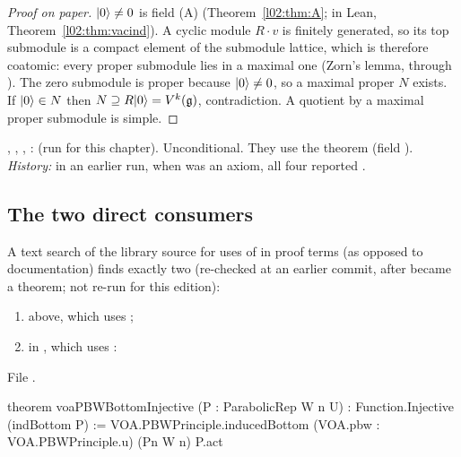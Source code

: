 \begin{proof}[Proof on paper]
$|0\rangle\ne0$ is field (A) (Theorem~\ref{l02:thm:A}; in Lean, Theorem~\ref{l02:thm:vacind}). A cyclic module $R\cdot v$ is finitely generated, so
its top submodule is a compact element of the submodule lattice, which is therefore coatomic: every
proper submodule lies in a maximal one (Zorn's lemma, through \allowbreak{}\allowbreak{}\allowbreak{}\allowbreak{}).
The zero submodule is proper because $|0\rangle\ne0$, so a maximal proper $N$ exists. If $|0\rangle\in N$ then
$N\supseteq R|0\rangle = V^k(\mathfrak{g})$, contradiction. A quotient by a maximal proper submodule is simple.
\end{proof}

\begin{status}
\allowbreak{}\allowbreak{}\allowbreak{}\allowbreak{}, \allowbreak{}\allowbreak{}\allowbreak{},
\allowbreak{}\allowbreak{}\allowbreak{}\allowbreak{}, \allowbreak{}\allowbreak{}\allowbreak{}:
 (run for this chapter). Unconditional. They use the
theorem  (field ). \emph{History:} in an earlier run, when 
was an axiom, all four reported .
\end{status}

\subsection{The two direct consumers}

A text search of the library source for uses of  in proof terms (as opposed to
documentation) finds exactly two (re-checked at an earlier commit, after  became a theorem; not re-run for this edition):
\begin{enumerate}
\item {}\allowbreak{}\allowbreak{}\allowbreak{} above, which uses ;
\item {}\allowbreak{}\allowbreak{}\allowbreak{} in
  , which uses
  \allowbreak{}:
\end{enumerate}
File .
\begin{leancode}
theorem voaPBWBottomInjective (P : ParabolicRep W n U) :
    Function.Injective (indBottom P) :=
  VOA.PBWPrinciple.inducedBottom
    (VOA.pbw : VOA.PBWPrinciple.{u}) (Pn W n) P.act
\end{leancode}

